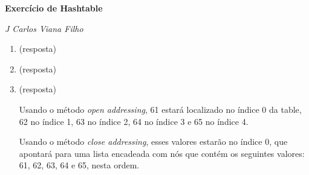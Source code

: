 \documentclass[a4paper,11pt]{article}
\begin{document}
\begin{flushright}
\makeatletter
\textit{\@date}
\makeatother
\end{flushright}

\begin{center}
{\Large \textbf{Exercício de Hashtable}}
\end{center}

\textit{J Carlos Viana Filho}


\begin{enumerate}

\item (resposta)


\item (resposta)


\item (resposta)

Usando o método \textit{open addressing}, 61 estará localizado no índice 0 da table, 62 no índice 1, 63 no índice 2, 64 no índice 3 e 65 no índice 4.

Usando o método \textit{close addressing}, esses valores estarão no índice 0, que apontará para uma lista encadeada com nós que contém os seguintes valores: 61, 62, 63, 64 e 65, nesta ordem.

\end{enumerate}
\end{document}
